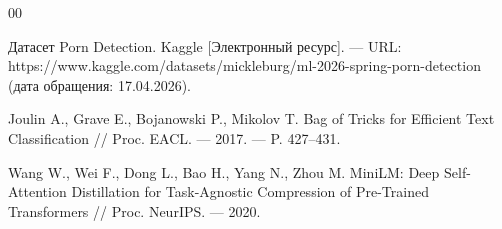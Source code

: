 \documentclass[oneside, a5paper,10pt]{article}
\begin{document}
    \begin{thebibliography}{00}

        \setlength{\itemsep}{1.0pt plus 1.0pt}
        Датасет Porn Detection. Kaggle [Электронный ресурс]. ---
        URL: https://www.kaggle.com/datasets/mickleburg/ml-2026-spring-porn-detection
        (дата обращения: 17.04.2026).

        Joulin A., Grave E., Bojanowski P., Mikolov T.
        Bag of Tricks for Efficient Text Classification //
        Proc. EACL. --- 2017. --- P. 427--431.

        Wang W., Wei F., Dong L., Bao H., Yang N., Zhou M.
        MiniLM: Deep Self-Attention Distillation for
        Task-Agnostic Compression of Pre-Trained Transformers //
        Proc. NeurIPS. --- 2020.

    \end{thebibliography}
\end{document}
